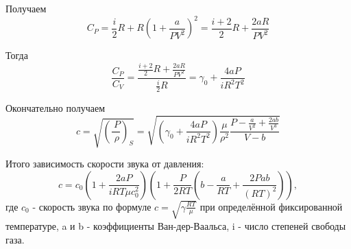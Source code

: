 \documentclass[a4paper,12pt]{article}
\begin{document}
Получаем
\begin{equation}
C_P = \frac{i}{2}R + R(1 + \frac{a}{PV^2})^2 = \frac{i+2}{2}R + \frac{2aR}{PV^2}
\end{equation}

Тогда 
\begin{equation}
\frac{C_P}{C_V} = \frac{\frac{i+2}{2}R + \frac{2aR}{PV^2}}{\frac{i}{2}R} = \gamma_0 + \frac{4aP}{iR^2T^2}
\end{equation}

Окончательно получаем 
\begin{equation}
c = \sqrt{\left ( \frac{\ P}{\ \rho}\right )_S} = \sqrt{(\gamma_0 + \frac{4aP}{iR^2T^2})\frac{\mu}{\rho^2}\frac{P - \frac{a}{V^2} + \frac{2ab}{V^3}}{V - b}}
\end{equation}

Итого зависимость скорости звука от давления:
\begin{equation}
c = c_0 \left ( 1 + \frac{2aP}{iRT\mu c^2_0} \right )\left ( 1 + \frac{P}{2RT} \left ( b - \frac{a}{RT} + \frac{2Pab}{(RT)^2} \right ) \right ),
\end{equation}
где $c_0$ - скорость звука по формуле $c = \sqrt{\gamma \frac{RT}{\mu}}$ при определённой фиксированной температуре, a и b - коэффициенты Ван-дер-Ваальса, i - число степеней свободы газа. 
\end{document}
